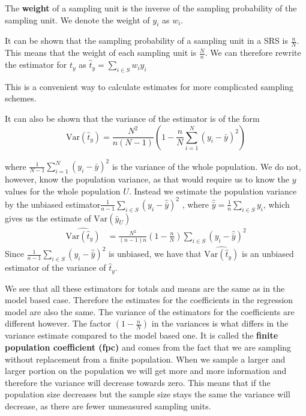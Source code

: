 \documentclass{article}
\begin{document}
\begin{definition}
 The \textbf{weight} of a sampling unit is the inverse of the sampling
 probability of the sampling unit. 
 We denote the weight of \(y_i\) as \(w_i\).
\end{definition}

It can be shown that the sampling probability of a sampling unit in a SRS is
\(\frac{n}{N}\). This means that the weight of each sampling unit is
\(\frac{N}{n}\). We can therefore rewrite the estimator for \(t_y\) as
\(
\hat{t}_y = \sum_{i \in S} w_i y_i
\)

This is a convenient way to calculate estimates for more complicated sampling
schemes.

It can also be shown that the variance of the estimator is of the form \begin{equation*}
\mathrm{Var} \left( \hat{t}_y \right) = \frac{N^2}{n \left( N - 1 \right)} \left( 1 - \frac{n}{N} \sum_{i = 1}^N (y_i - \bar{y})^2 
\right)
\end{equation*}

where
\(
\frac{1}{N - 1} \sum_{i = 1}^N (y_i - \bar{y})^2
\)
is the variance of the whole population.
We do not, however, know the population variance, as that would require us to know the \(y\) values
for the whole population \(U\). Instead we estimate the population variance by the unbiased estimator\(
 \frac{1}{n - 1} \sum_{i \in S} \left( y_i - \hat{\bar{y}} \right)^2
\)
, where \(\hat{\bar{y}} = \frac{1}{n} \sum_{i \in S} y_i \), which gives us the estimate of \(\mathrm{Var}(\bar{y}_U)\)\begin{align*}
 \widehat{\mathrm{Var}(\hat{t}_y)}
 &=\frac{N^2}{\left( n - 1 \right)n} \left( 1 - \frac{n}{N} \right) \sum_{i \in S} \left( y_i - \hat{\bar{y}} \right)^2
\end{align*}
Since \(\frac{1}{n - 1} \sum_{i \in S} \left( y_i - \hat{\bar{y}} \right)^2\) is unbiased, we have that \(\widehat{\mathrm{Var}(\hat{t}_y)}\) is an unbiased estimator of the variance of \(\hat{t}_y\).

We see that all these estimators for totals and means are the same as in the
model based case. Therefore the estimates for the coefficients in the regression
model are also the same. The variance of the estimators for the coefficients are
different however.
The factor \(\left( 1 - \frac{n}{N} \right)\) in the variances is what differs in
the variance estimate compared to the model based one. It is called the
\textbf{finite population coefficient (fpc)} and comes from the fact that we are
sampling without replacement from a finite population.
When we sample a larger and larger portion on the population we will get more
and more information and therefore the variance will decrease towards zero.
This means that if the population size decreases but the sample size stays the
same the variance will decrease, as there are fewer unmeasured sampling units.
\end{document}
